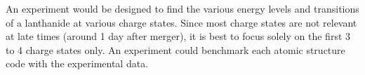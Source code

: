 \documentclass[11pt,a4paper]{article}
\begin{document}
An experiment would be designed to find the various energy levels and transitions of a lanthanide at various charge states. Since most charge states are not relevant at late times (around 1 day after merger), it is best to focus solely on the first 3 to 4 charge states only. An experiment could benchmark each atomic structure code with the experimental data.


\end{document}
